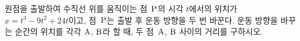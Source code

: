 원점을 출발하여 수직선 위를 움직이는 점~$\mathrm{P}$의 시각 $t$에서의 위치가 $x=t^3-9t^2+24t$이고, 점~$\mathrm{P}$는 출발 후 운동 방향을 두 번 바꾼다. 운동 방향을 바꾸는 순간의 위치를 각각 $\mathrm{A}$, $\mathrm{B}$라 할 때, 두 점~$\mathrm{A}$, $\mathrm{B}$ 사이의 거리를 구하시오.
